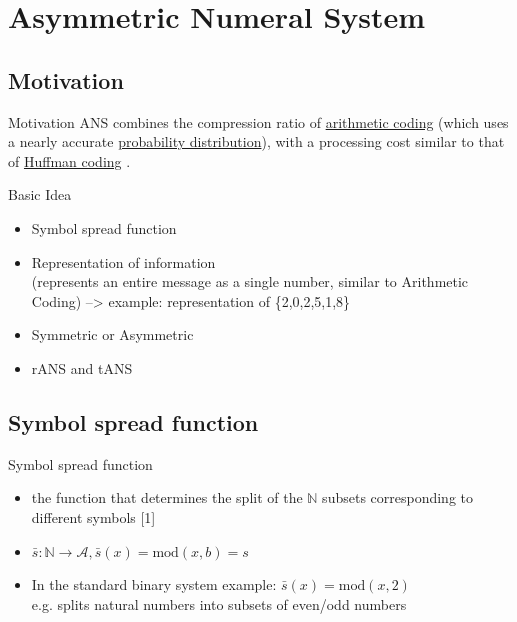 \section{Asymmetric Numeral System}



\subsection{Motivation}
    \begin{frame}[fragile]{Motivation}
        ANS combines the compression ratio of \href{https://en.wikipedia.org/wiki/Arithmetic_coding}{arithmetic coding} (which uses a nearly accurate \href{https://en.wikipedia.org/wiki/Probability_distribution}{probability distribution}), with a processing cost similar to that of \href{https://en.wikipedia.org/wiki/Huffman_coding}{Huffman coding} .
    \end{frame}

    \begin{frame}[fragile]{Basic Idea}
        \begin{itemize}
            \item<1-> Symbol spread function
            \item<2-> Representation of information \\
            (represents an entire message as a single number, similar to Arithmetic Coding) --> example: representation of \{2,0,2,5,1,8\}
            \item<3-> Symmetric or Asymmetric
            \item<4-> rANS and tANS
        \end{itemize}
    \end{frame}

\subsection{Symbol spread function}
    \begin{frame}[fragile]{Symbol spread function}
        \begin{itemize}
            \item<1-> the function that determines the split of the $\mathbb{N}$ subsets corresponding to different symbols [1]
            \item<2-> $\bar{s}: \mathbb{N} \rightarrow \mathcal{A}, \bar{s}(x) = \text{mod}(x,b) = s$
            \item<3-> In the standard binary system example: $\bar{s}(x) = \text{mod}(x,2)$ \\ e.g. splits natural numbers into subsets of even/odd numbers 
        \end{itemize}
    \end{frame}


